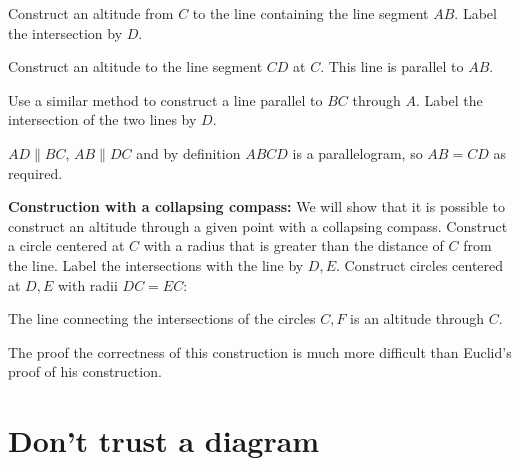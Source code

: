 Construct an altitude from $C$ to the line containing the line segment $AB$. Label the intersection by $D$.

Construct an altitude to the line segment $CD$ at $C$. This line is parallel to $AB$.

Use a similar method to construct a line parallel to $BC$ through $A$. Label the intersection of the two lines by $D$.

$AD\|BC$, $AB\|DC$ and by definition $ABCD$ is a parallelogram, so $AB=CD$ as required.

\textbf{Construction with a collapsing compass:} We will show that it is possible to construct an altitude through a given point with a collapsing compass. Construct a circle centered at $C$ with a radius that is greater than the distance of $C$ from the line. Label the intersections with the line by $D,E$. Construct circles centered at $D,E$ with radii $DC=EC$:
\begin{center}
\end{center}
The line connecting the intersections of the circles $C,F$ is an altitude through $C$.

The proof the correctness of this construction is much more difficult than Euclid's proof of his construction.


\section{Don't trust a diagram}

